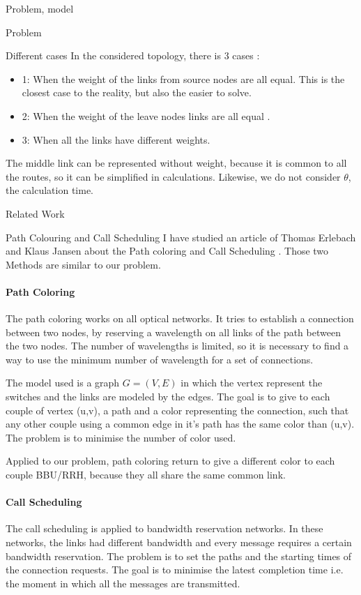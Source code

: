 \documentclass[a4paper,10pt]{report}
\begin{document}
\begin{chapter}{Problem, model}
\begin{section}{Problem}
\begin{subsection}{Different cases}
In the considered topology, there is 3 cases :
\begin{itemize}
 \item 1: When the weight of the links from source nodes are all equal. This is the closest case to the reality, but also the easier to solve.
 \item 2: When the weight of the leave nodes links are all equal .
 \item 3: When all the links have different weights.
\end{itemize}
The middle link can be represented without weight, because it is common to all the routes, so it can be simplified in calculations. 
Likewise, we do not consider $\theta$, the calculation time.

\end{subsection}
\end{section}
\begin{section}{Related Work}
\begin{subsection}{Path Colouring and Call Scheduling}
I have studied an article of Thomas Erlebach and Klaus Jansen about the Path coloring and Call Scheduling \cite{erlebach2001complexity}.
Those two Methods are similar to our problem.

\paragraph{Path Coloring}
The path coloring works on all optical networks. It tries to establish a connection between two nodes, by reserving a wavelength on all links of the
path between the two nodes. The number of wavelengths is limited, so it is necessary to find a way to use the minimum number of wavelength for a set 
of connections.

The model used is a graph $G=(V,E)$ in which the vertex represent the switches and the links are modeled by the edges. The goal is to give to each
couple of vertex (u,v), a path and a color representing the connection, such that any other couple using a common edge in it's path has the same
color than (u,v). The problem is to minimise the number of color used.

Applied to our problem, path coloring return to give a different color to each couple BBU/RRH, because they all share the same common link.


\paragraph{Call Scheduling}
The call scheduling is applied to bandwidth reservation networks. In these networks, the links had different bandwidth and every message 
requires a certain bandwidth reservation. The problem is to set the paths and the starting times of the connection requests.
The goal is to minimise the latest completion time i.e. the moment in which all the messages are transmitted.


\end{subsection}
\end{section}
\end{chapter}
\end{document}
